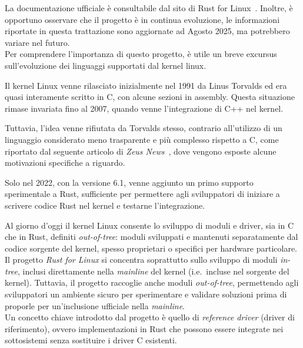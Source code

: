 La documentazione ufficiale è consultabile dal sito di Rust for Linux~\cite{rust-for-linux}. Inoltre, è opportuno osservare che il 
progetto è in continua evoluzione, le informazioni riportate in questa trattazione sono aggiornate ad Agosto 2025, ma potrebbero variare nel futuro. \hfill
\vspace{5pt} \\
\noindent Per comprendere l'importanza di questo progetto, è utile un breve excursus sull'evoluzione dei linguaggi supportati dal kernel linux.
\begin{framed}
\noindent Il kernel Linux venne rilasciato inizialmente nel 1991 da Linus Torvalds ed era quasi interamente scritto in C,
con alcune sezioni in assembly. Questa situazione rimase 
invariata fino al 2007, quando venne l'integrazione di
C++ nel kernel. 

Tuttavia, l'idea venne rifiutata da Torvalds stesso,
contrario all'utilizzo di un linguaggio considerato meno trasparente e più complesso rispetto a C,
 come riportato dal seguente articolo di \textit{Zeus News}~\cite{linus-cpp}, dove vengono esposte alcune motivazioni specifiche a riguardo.

 Solo nel 2022, con la versione 6.1, venne aggiunto un primo supporto sperimentale a Rust, sufficiente per permettere agli sviluppatori
di iniziare a scrivere codice Rust nel kernel e testarne l'integrazione.
\end{framed}
\noindent Al giorno d'oggi il kernel Linux consente lo sviluppo di moduli e driver, sia
in C che in Rust, definiti \textit{out-of-tree}: moduli sviluppati e mantenuti separatamente dal codice sorgente del kernel,
spesso proprietari o specifici per hardware particolare. \hfill
\vspace{7pt} \\
\noindent Il progetto \textit{Rust for Linux} si concentra soprattutto sullo sviluppo di moduli \textit{in-tree}, inclusi direttamente nella \textit{mainline} del kernel (i.e.\  incluse nel sorgente del kernel).
Tuttavia, il progetto raccoglie anche moduli \textit{out-of-tree}, permettendo agli sviluppatori un ambiente sicuro per sperimentare e validare 
soluzioni prima di proporle per un'inclusione ufficiale nella \textit{mainline}.\hfill 
\vspace{15pt}\\
\noindent Un concetto chiave introdotto dal progetto è quello di \textit{reference driver} (driver di riferimento), ovvero implementazioni in Rust che possono essere integrate 
nei sottosistemi senza sostituire i driver C esistenti.


